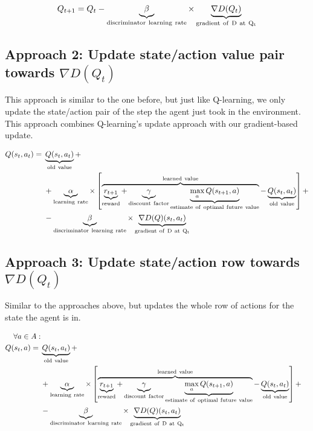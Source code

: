 \begin{equation}
Q_{t+1} = Q_{t}-\underbrace{\beta}_{\rm discriminator~learning~rate} \times \underbrace{\nabla D(Q_{t})}_{\rm gradient~of~D~at~Q_{t}}
\end{equation}

\subsection{Approach 2: Update state/action value pair towards $\nabla D(Q_{t})$}
This approach is similar to the one before, but just like Q-learning, we only update the state/action pair of the step the agent just took in the environment. This approach combines Q-learning's update approach with our gradient-based update.

\begin{equation}
\begin{aligned}
  Q(s_{t},a_{t}) ={} &\underbrace{Q(s_t,a_t)}_{\rm old~value} + \\
  & + \underbrace{\alpha}_{\rm learning~rate} \times \left[
    \overbrace{\underbrace{r_{t+1}}_{\rm reward} + \underbrace{\gamma}_{\rm
        discount~factor} \underbrace{\max_{a}Q(s_{t+1}, a)}_{\rm
        estimate~of~optimal~future~value}}^{\rm learned~value} - \underbrace{Q(s_t,a_t)}_{\rm old~value} \right] + \\
   & - \underbrace{\beta}_{\rm discriminator~learning~rate} \times \underbrace{\nabla D(Q)(s_{t}, a_{t})}_{\rm gradient~of~D~at~Q_{t}}
\end{aligned}
\end{equation}

\subsection{Approach 3: Update state/action row towards $\nabla D(Q_{t})$}
Similar to the approaches above, but updates the whole row of actions for the state the agent is in.

\begin{equation}
\begin{aligned}
  \forall a \in A: \\
  Q(s_{t},a) ={} &\underbrace{Q(s_t,a_t)}_{\rm old~value} + \\
  & + \underbrace{\alpha}_{\rm learning~rate} \times \left[
    \overbrace{\underbrace{r_{t+1}}_{\rm reward} + \underbrace{\gamma}_{\rm
        discount~factor} \underbrace{\max_{a}Q(s_{t+1}, a)}_{\rm
        estimate~of~optimal~future~value}}^{\rm learned~value} - \underbrace{Q(s_t,a_t)}_{\rm old~value} \right] + \\
   & - \underbrace{\beta}_{\rm discriminator~learning~rate} \times \underbrace{\nabla D(Q)(s_{t}, a_{t})}_{\rm gradient~of~D~at~Q_{t}}
\end{aligned}
\end{equation}

